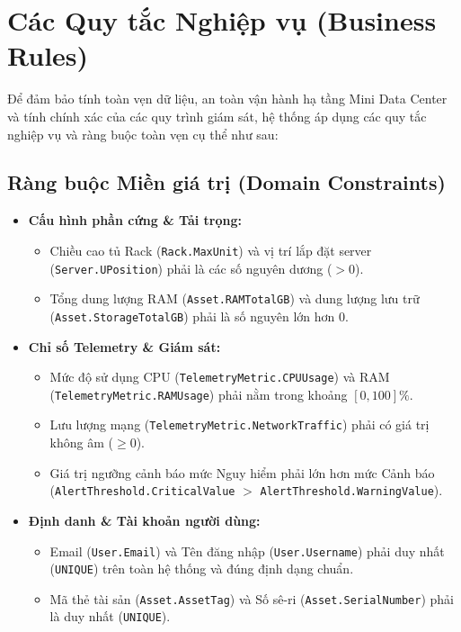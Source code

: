 \section{Các Quy tắc Nghiệp vụ (Business Rules)}

Để đảm bảo tính toàn vẹn dữ liệu, an toàn vận hành hạ tầng Mini Data Center và tính chính xác của các quy trình giám sát, hệ thống áp dụng các quy tắc nghiệp vụ và ràng buộc toàn vẹn cụ thể như sau:

\subsection{Ràng buộc Miền giá trị (Domain Constraints)}
\begin{itemize}[leftmargin=2em]
    \item \textbf{Cấu hình phần cứng \& Tải trọng:}
    \begin{itemize}
        \item Chiều cao tủ Rack (\texttt{Rack.MaxUnit}) và vị trí lắp đặt server (\texttt{Server.UPosition}) phải là các số nguyên dương ($> 0$).
        \item Tổng dung lượng RAM (\texttt{Asset.RAMTotalGB}) và dung lượng lưu trữ (\texttt{Asset.StorageTotalGB}) phải là số nguyên lớn hơn $0$.
    \end{itemize}
    \item \textbf{Chỉ số Telemetry \& Giám sát:}
    \begin{itemize}
        \item Mức độ sử dụng CPU (\texttt{TelemetryMetric.CPUUsage}) và RAM (\texttt{TelemetryMetric.RAMUsage}) phải nằm trong khoảng $[0, 100]\%$.
        \item Lưu lượng mạng (\texttt{TelemetryMetric.NetworkTraffic}) phải có giá trị không âm ($\ge 0$).
        \item Giá trị ngưỡng cảnh báo mức Nguy hiểm phải lớn hơn mức Cảnh báo (\texttt{AlertThreshold.CriticalValue} $>$ \texttt{AlertThreshold.WarningValue}).
    \end{itemize}
    \item \textbf{Định danh \& Tài khoản người dùng:}
    \begin{itemize}
        \item Email (\texttt{User.Email}) và Tên đăng nhập (\texttt{User.Username}) phải duy nhất (\texttt{UNIQUE}) trên toàn hệ thống và đúng định dạng chuẩn.
        \item Mã thẻ tài sản (\texttt{Asset.AssetTag}) và Số sê-ri (\texttt{Asset.SerialNumber}) phải là duy nhất (\texttt{UNIQUE}).
    \end{itemize}
\end{itemize}

